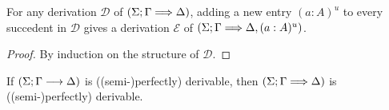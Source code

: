 \documentclass[twoside]{report}
\begin{document}
\begin{proposition}
    \label{thm:defocusing_lemma}
    For any derivation $\mathcal D$ of $(\Sigma; \Gamma \Longrightarrow \Delta)$, adding a new entry $(a : A)^u$ to every succedent in $\mathcal D$ gives a derivation $\mathcal E$ of $(\Sigma; \Gamma \Longrightarrow \Delta, (a : A)^u)$.
\end{proposition}

\begin{proof}
    By induction on the structure of $\mathcal D$.
\end{proof}

\begin{proposition}[Defocusing]
    \label{thm:defocusing}
    If $(\Sigma; \Gamma \longrightarrow \Delta)$ is ((semi-)perfectly) derivable, then $(\Sigma; \Gamma \Longrightarrow \Delta)$ is ((semi-)perfectly) derivable.
\end{proposition}
\end{document}
